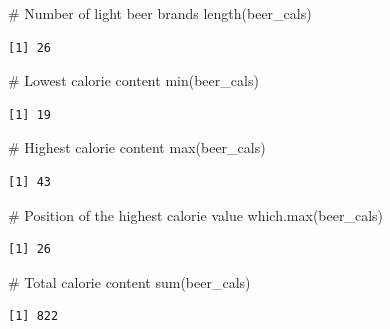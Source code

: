 \documentclass[
  letterpaper,
  DIV=11,
  numbers=noendperiod]{scrreprt}
\newenvironment{Shaded}{\begin{snugshade}}{\end{snugshade}}
\newcommand{\CommentTok}[1]{\textcolor[rgb]{0.37,0.37,0.37}{#1}}
\newcommand{\FunctionTok}[1]{\textcolor[rgb]{0.28,0.35,0.67}{#1}}
\newcommand{\NormalTok}[1]{\textcolor[rgb]{0.00,0.23,0.31}{#1}}
\begin{document}
\begin{tcolorbox}[enhanced jigsaw, colbacktitle=quarto-callout-tip-color!10!white, opacitybacktitle=0.6, breakable, left=2mm, leftrule=.75mm, toprule=.15mm, toptitle=1mm, bottomtitle=1mm, colframe=quarto-callout-tip-color-frame, opacityback=0, coltitle=black, arc=.35mm, titlerule=0mm, colback=white, bottomrule=.15mm, title=\textcolor{quarto-callout-tip-color}{\faLightbulb}\hspace{0.5em}{Answer}, rightrule=.15mm]

\begin{Shaded}
\begin{Highlighting}[]
\CommentTok{\# Number of light beer brands}
\FunctionTok{length}\NormalTok{(beer\_cals)}
\end{Highlighting}
\end{Shaded}

\begin{verbatim}
[1] 26
\end{verbatim}

\begin{Shaded}
\begin{Highlighting}[]
\CommentTok{\# Lowest calorie content}
\FunctionTok{min}\NormalTok{(beer\_cals)}
\end{Highlighting}
\end{Shaded}

\begin{verbatim}
[1] 19
\end{verbatim}

\begin{Shaded}
\begin{Highlighting}[]
\CommentTok{\# Highest calorie content}
\FunctionTok{max}\NormalTok{(beer\_cals)}
\end{Highlighting}
\end{Shaded}

\begin{verbatim}
[1] 43
\end{verbatim}

\begin{Shaded}
\begin{Highlighting}[]
\CommentTok{\# Position of the highest calorie value}
\FunctionTok{which.max}\NormalTok{(beer\_cals)}
\end{Highlighting}
\end{Shaded}

\begin{verbatim}
[1] 26
\end{verbatim}

\begin{Shaded}
\begin{Highlighting}[]
\CommentTok{\# Total calorie content}
\FunctionTok{sum}\NormalTok{(beer\_cals)}
\end{Highlighting}
\end{Shaded}

\begin{verbatim}
[1] 822
\end{verbatim}

\end{tcolorbox}
\end{document}
